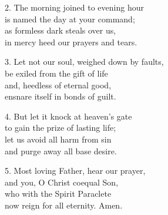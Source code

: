 2. The morning joined to evening hour\\
is named the day at your command;\\
as formless dark steals over us,\\
in mercy heed our prayers and tears.

3. Let not our soul, weighed down by faults,\\
be exiled from the gift of life\\
and, heedless of eternal good,\\
ensnare itself in bonds of guilt.
\columnbreak

4. But let it knock at heaven’s gate\\
to gain the prize of lasting life;\\
let us avoid all harm from sin\\
and purge away all base desire.

5. Most loving Father, hear our prayer,\\
and you, O Christ coequal Son,\\
who with the Spirit Paraclete\\
now reign for all eternity. Amen.
